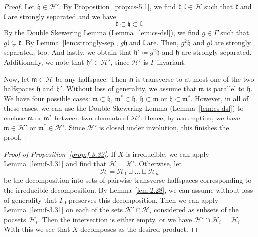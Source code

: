 \begin{proof}
  Let \(\mathfrak{h} \in \mathcal{H}'\). By Proposition~\ref{prop:cs-5.1}, we find \(\mathfrak{k}, \mathfrak{l} \in \mathcal{H}\) such that \(\mathfrak{k}\) and \(\mathfrak{l}\) are strongly separated and we have
  \[
    \mathfrak{k} \subset \mathfrak{h} \subset \mathfrak{l}.
  \]
  By the Double Skewering Lemma (Lemma~\ref{lem:cs-dsl}), we find \(g \in \Gamma\) such that \(g\mathfrak{l} \subsetneq \mathfrak{k}\). By Lemma~\ref{lem:strongly-sep}, \(g\mathfrak{h}\) and \(\mathfrak{l}\) are. Then, \(g^2\mathfrak{h}\) and \(g\mathfrak{l}\) are strongly separated, too. And lastly, we obtain that \(\mathfrak{h}'\coloneqq g^2\mathfrak{h}\) and \(\mathfrak{h}\) are strongly separated. Additionally, we note that \(\mathfrak{h}' \in \mathcal{H}'\), since \(\mathcal{H}'\) is \(\Gamma\)-invariant.
  
  Now, let \(\mathfrak{m} \in \mathcal{H}\) be any halfspace. Then \(\mathfrak{m}\) is transverse to at most one of the two halfspaces \(\mathfrak{h}\) and \(\mathfrak{h}'\). Without loss of generality, we assume that \(\mathfrak{m}\) is parallel to \(\mathfrak{h}\). We have four possible cases: \(\mathfrak{m} \subset \mathfrak{h}\), \(\mathfrak{m}^\ast \subset \mathfrak{h}\), \(\mathfrak{h} \subset \mathfrak{m}\) or \(\mathfrak{h} \subset \mathfrak{m}^\ast\). However, in all of these cases, we can use the Double Skewering Lemma (Lemma~\ref{lem:cs-dsl}) to enclose \(\mathfrak{m}\) or \(\mathfrak{m}^\ast\) between two elements of \(\mathcal{H}'\). Hence, by assumption, we have \(\mathfrak{m} \in \mathcal{H}'\) or \(\mathfrak{m}^\ast \in \mathcal{H}'\). Since \(\mathcal{H}'\) is closed under involution, this finishes the proof.
\end{proof}

\begin{proof}[Proof of Proposition~\ref{prop:f-3.32}]
  If \(X\) is irreducible, we can apply Lemma~\ref{lem:f-3.31} and find that \(\mathcal{H} = \mathcal{H}'\). Otherwise, let
  \[
    \mathcal{H} = \mathcal{H}_1 \sqcup \dots \sqcup \mathcal{H}_n
  \]
  be the decomposition into sets of pairwise transverse halfspaces corresponding to the irreducible decomposition. By Lemma~\ref{lem:2.28}, we can assume without loss of generality that \(\Gamma_0\) preserves this decomposition. Then we can apply Lemma~\ref{lem:f-3.31} on each of the sets \(\mathcal{H}' \cap \mathcal{H}_i\) considered as subsets of the pocsets \(\mathcal{H}_i\). Then the intersection is either empty, or we have \(\mathcal{H}' \cap \mathcal{H}_i = \mathcal{H}_i\). With this we see that \(X\) decomposes as the desired product.
\end{proof}

